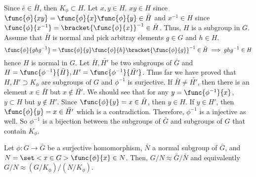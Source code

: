 \begin{prooflemma}
    Since \(\bar{e} \in \bar{H}\), then \(K_{\phi} \subset H\). Let \(x,y \in H\). \(xy \in H\) since \(\func{\phi}{xy} = \func{\phi}{x} \func{\phi}{y} \in \bar{H}\) and \(x^{-1} \in H\) since \(\func{\phi}{x^{-1}} = \bracket{\func{\phi}{x}}^{-1} \in \bar{H}\). Thus, \(H\) is a subgroup in \(G\). Assume that \(\bar{H}\) is normal and pick arbitray elements \(g \in G\) and \(h \in H\). 
    \begin{equation*}
        \func{\phi}{ghg^{-1}} = \func{\phi}{g} \func{\phi}{h} \bracket{\func{\phi}{g}}^{-1} \in \bar{H } \implies ghg^{-1} \in H
    \end{equation*}
    hence \(H\) is normal in \(G\). Let \(\bar{H},\bar{H'}\) be two subgroups of \(\bar{G}\) and \(H = \func{\phi^{-1}}{\bar{H}},H'= \func{\phi^{-1}}{\bar{H'}}\). Thus far we have proved that \(H,H' \supset K_{\phi}\) are subgroups of \(G\) and \(\phi^{-1}\) is surjective. If \(\bar{H} \neq \bar{H'}\), then there is an element \(x \in \bar{H}\) but \(x \notin \bar{H'}\). We should see that for any \(y = \func{\phi^{-1}}{x}\), \(y \subset H\) but \(y \notin H'\). Since \(\func{\phi}{y} = x \in \bar{H}\), then \(y \in H\). If \(y \in H'\), then \(\func{\phi}{y} = x \in \bar{H'}\) which is a contradiction. Therefore, \(\phi^{-1}\) is a injective as well. So \(\phi^{-1}\) is a bijection between the subgroups of \(\bar{G}\) and subgroups of \(G\) that contain \(K_{\phi}\).
\end{prooflemma}

\begin{theorem}
    Let \(\phi:G \to \bar{G}\) be a surjective homomorphism, \(\bar{N}\) a normal subgroup of \(\bar{G}\), and \(N = \set<x \in G>{\func{\phi}{x} \in N}\). Then, \(G/N \approx \bar{G}/\bar{N}\) and equivalently \(G/N \approx (G/K_{\phi})/(N/K_{\phi})\).
\end{theorem}

